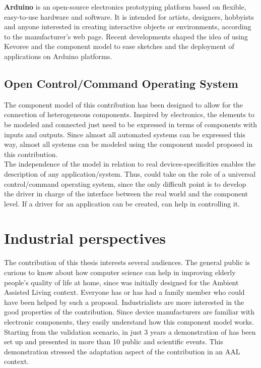 {\bf Arduino} is an open-source electronics prototyping platform based on flexible, easy-to-use hardware and software. It is intended for artists, designers, hobbyists and anyone interested in creating interactive objects or environments, according to the manufacturer's web page. Recent developments shaped the idea of using Kevoree and the component model to ease sketches and the deployment of applications on Arduino platforms.


\section{Open Control/Command Operating System}

The component model of this contribution has been designed to allow for the connection of heterogeneous components. Inspired by electronics, the elements to be modeled and connected just need to be expressed in terms of components with inputs and outputs. Since almost all automated systems can be expressed this way, almost all systems can be modeled using the component model proposed in this contribution.\\
The independence of the model in relation to real devices-specificities enables the description of any application/system. Thus, \enti{} could take on the role of a universal control/command operating system, since the only difficult point is to develop the driver in charge of the interface between the real world and the component level. If a driver for an application can be created, \enti{} can help in controlling it.


\chapter{Industrial perspectives}
\label{ch:industrialPerspectives}

The contribution of this thesis interests several audiences. The general public is curious to know about how computer science can help in improving elderly people's quality of life at home, since \enti{} was initially designed for the Ambient Assisted Living context. Everyone has or has had a family member who could have been helped by such a proposal. Industrialists are more interested in the good properties of the contribution. Since device manufacturers are familiar with electronic components, they easily understand how this component model works.\\
Starting from the validation scenario, in just 3 years a demonstration of \enti{} has been set up and presented in more than 10 public and scientific events. This demonstration stressed the adaptation aspect of the contribution in an AAL context.

